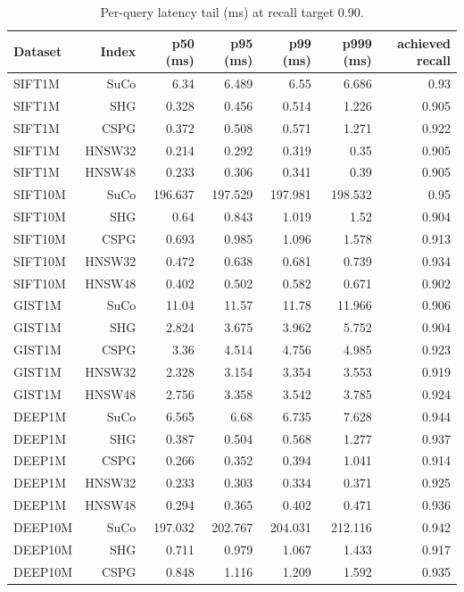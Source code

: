 \begin{table}[t]
\centering
\small
\caption{Per-query latency tail (ms) at recall target 0.90.}
\label{tab:latency-tail-r90}
\begin{tabular}{lrrrrrr}
\toprule
Dataset & Index & p50 (ms) & p95 (ms) & p99 (ms) & p999 (ms) & achieved recall \\
\midrule
SIFT1M & SuCo & 6.34 & 6.489 & 6.55 & 6.686 & 0.93 \\
SIFT1M & SHG & 0.328 & 0.456 & 0.514 & 1.226 & 0.905 \\
SIFT1M & CSPG & 0.372 & 0.508 & 0.571 & 1.271 & 0.922 \\
SIFT1M & HNSW32 & 0.214 & 0.292 & 0.319 & 0.35 & 0.905 \\
SIFT1M & HNSW48 & 0.233 & 0.306 & 0.341 & 0.39 & 0.905 \\
SIFT10M & SuCo & 196.637 & 197.529 & 197.981 & 198.532 & 0.95 \\
SIFT10M & SHG & 0.64 & 0.843 & 1.019 & 1.52 & 0.904 \\
SIFT10M & CSPG & 0.693 & 0.985 & 1.096 & 1.578 & 0.913 \\
SIFT10M & HNSW32 & 0.472 & 0.638 & 0.681 & 0.739 & 0.934 \\
SIFT10M & HNSW48 & 0.402 & 0.502 & 0.582 & 0.671 & 0.902 \\
GIST1M & SuCo & 11.04 & 11.57 & 11.78 & 11.966 & 0.906 \\
GIST1M & SHG & 2.824 & 3.675 & 3.962 & 5.752 & 0.904 \\
GIST1M & CSPG & 3.36 & 4.514 & 4.756 & 4.985 & 0.923 \\
GIST1M & HNSW32 & 2.328 & 3.154 & 3.354 & 3.553 & 0.919 \\
GIST1M & HNSW48 & 2.756 & 3.358 & 3.542 & 3.785 & 0.924 \\
DEEP1M & SuCo & 6.565 & 6.68 & 6.735 & 7.628 & 0.944 \\
DEEP1M & SHG & 0.387 & 0.504 & 0.568 & 1.277 & 0.937 \\
DEEP1M & CSPG & 0.266 & 0.352 & 0.394 & 1.041 & 0.914 \\
DEEP1M & HNSW32 & 0.233 & 0.303 & 0.334 & 0.371 & 0.925 \\
DEEP1M & HNSW48 & 0.294 & 0.365 & 0.402 & 0.471 & 0.936 \\
DEEP10M & SuCo & 197.032 & 202.767 & 204.031 & 212.116 & 0.942 \\
DEEP10M & SHG & 0.711 & 0.979 & 1.067 & 1.433 & 0.917 \\
DEEP10M & CSPG & 0.848 & 1.116 & 1.209 & 1.592 & 0.935 \\

\end{tabular}
\end{table}
